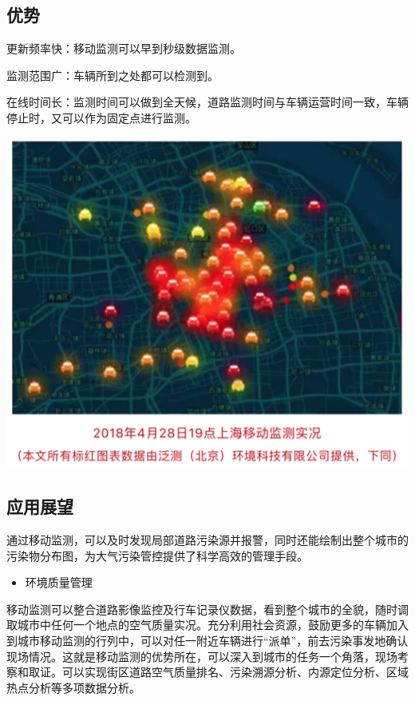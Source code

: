 \documentclass[]{book}
\providecommand{\tightlist}{%
  \setlength{\itemsep}{0pt}\setlength{\parskip}{0pt}}
\begin{document}
\subsection{优势}

更新频率快：移动监测可以早到秒级数据监测。

监测范围广：车辆所到之处都可以检测到。

在线时间长：监测时间可以做到全天候，道路监测时间与车辆运营时间一致，车辆停止时，又可以作为固定点进行监测。

\includegraphics[width=6.67in]{images/dlyd2}

\subsection{应用展望}

通过移动监测，可以及时发现局部道路污染源并报警，同时还能绘制出整个城市的污染物分布图，为大气污染管控提供了科学高效的管理手段。

\begin{itemize}
\tightlist
\item
  环境质量管理
\end{itemize}

移动监测可以整合道路影像监控及行车记录仪数据，看到整个城市的全貌，随时调取城市中任何一个地点的空气质量实况。充分利用社会资源，鼓励更多的车辆加入到城市移动监测的行列中，可以对任一附近车辆进行``派单''，前去污染事发地确认现场情况。这就是移动监测的优势所在，可以深入到城市的任务一个角落，现场考察和取证。可以实现街区道路空气质量排名、污染溯源分析、内源定位分析、区域热点分析等多项数据分析。
\end{document}
